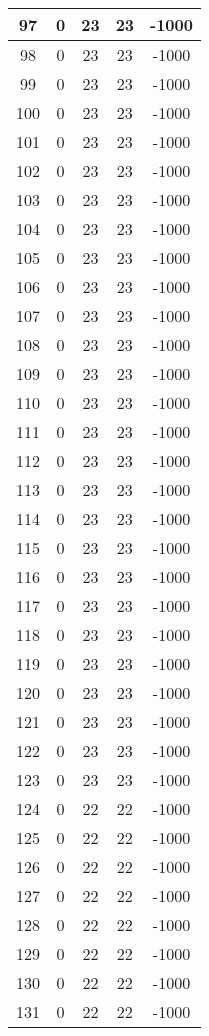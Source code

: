 \documentclass[letterpaper, 12pt]{article}
\begin{document}
\begin{longtable}{|c|c|c|c|c|}
\hline
97 & 0 & 23 & 23 & -1000 \\
\hline
98 & 0 & 23 & 23 & -1000 \\
\hline
99 & 0 & 23 & 23 & -1000 \\
\hline
100 & 0 & 23 & 23 & -1000 \\
\hline
101 & 0 & 23 & 23 & -1000 \\
\hline
102 & 0 & 23 & 23 & -1000 \\
\hline
103 & 0 & 23 & 23 & -1000 \\
\hline
104 & 0 & 23 & 23 & -1000 \\
\hline
105 & 0 & 23 & 23 & -1000 \\
\hline
106 & 0 & 23 & 23 & -1000 \\
\hline
107 & 0 & 23 & 23 & -1000 \\
\hline
108 & 0 & 23 & 23 & -1000 \\
\hline
109 & 0 & 23 & 23 & -1000 \\
\hline
110 & 0 & 23 & 23 & -1000 \\
\hline
111 & 0 & 23 & 23 & -1000 \\
\hline
112 & 0 & 23 & 23 & -1000 \\
\hline
113 & 0 & 23 & 23 & -1000 \\
\hline
114 & 0 & 23 & 23 & -1000 \\
\hline
115 & 0 & 23 & 23 & -1000 \\
\hline
116 & 0 & 23 & 23 & -1000 \\
\hline
117 & 0 & 23 & 23 & -1000 \\
\hline
118 & 0 & 23 & 23 & -1000 \\
\hline
119 & 0 & 23 & 23 & -1000 \\
\hline
120 & 0 & 23 & 23 & -1000 \\
\hline
121 & 0 & 23 & 23 & -1000 \\
\hline
122 & 0 & 23 & 23 & -1000 \\
\hline
123 & 0 & 23 & 23 & -1000 \\
\hline
124 & 0 & 22 & 22 & -1000 \\
\hline
125 & 0 & 22 & 22 & -1000 \\
\hline
126 & 0 & 22 & 22 & -1000 \\
\hline
127 & 0 & 22 & 22 & -1000 \\
\hline
128 & 0 & 22 & 22 & -1000 \\
\hline
129 & 0 & 22 & 22 & -1000 \\
\hline
130 & 0 & 22 & 22 & -1000 \\
\hline
131 & 0 & 22 & 22 & -1000 \\

\end{longtable}
\end{document}

